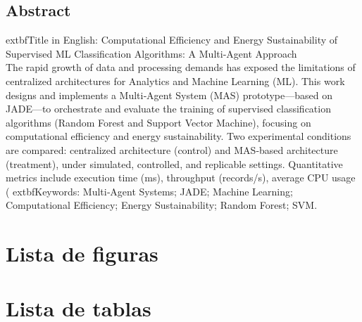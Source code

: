 \documentclass[12pt,twoside]{report}
\begin{document}
\section*{Abstract}
	extbf{Title in English:} Computational Efficiency and Energy Sustainability of Supervised ML Classification Algorithms: A Multi‑Agent Approach\\[0.5em]
The rapid growth of data and processing demands has exposed the limitations of centralized architectures for Analytics and Machine Learning (ML). This work designs and implements a Multi‑Agent System (MAS) prototype—based on JADE—to orchestrate and evaluate the training of supervised classification algorithms (Random Forest and Support Vector Machine), focusing on computational efficiency and energy sustainability. Two experimental conditions are compared: centralized architecture (control) and MAS‑based architecture (treatment), under simulated, controlled, and replicable settings. Quantitative metrics include execution time (ms), throughput (records/s), average CPU usage (%
	extbf{Keywords:} Multi‑Agent Systems; JADE; Machine Learning; Computational Efficiency; Energy Sustainability; Random Forest; SVM.
\clearpage

\tableofcontents
\clearpage

\chapter*{Lista de figuras}
\listoffigures
\clearpage

\chapter*{Lista de tablas}
\listoftables
\clearpage
\end{document}
